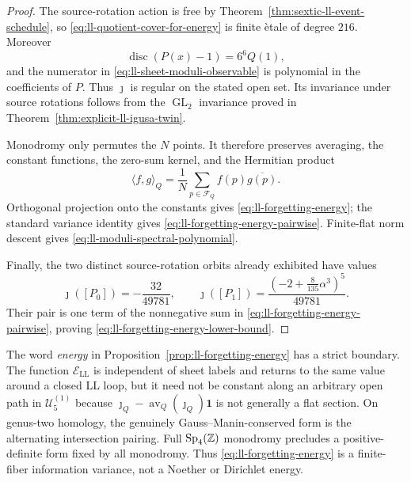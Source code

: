 \begin{proof}
The source-rotation action is free by
Theorem~\ref{thm:sextic-ll-event-schedule}, so
\eqref{eq:ll-quotient-cover-for-energy} is finite \`etale of degree $216$.
Moreover
\begin{equation}
 \operatorname{disc}(P(x)-1)=6^6Q(1),
 \label{eq:ll-energy-common-denominator}
\end{equation}
and the numerator in \eqref{eq:ll-sheet-moduli-observable} is polynomial in
the coefficients of $P$.  Thus $\jmath$ is regular on the stated open set.
Its invariance under source rotations follows from the
$\operatorname{GL}_2$ invariance proved in
Theorem~\ref{thm:explicit-ll-igusa-twin}.

Monodromy only permutes the $N$ points.  It therefore preserves averaging,
the constant functions, the zero-sum kernel, and the Hermitian product
\begin{equation}
 \langle f,g\rangle_Q
 =\frac1N\sum_{p\in\mathcal F_Q}f(p)\overline{g(p)}.
 \label{eq:ll-permutation-hermitian-product}
\end{equation}
Orthogonal projection onto the constants gives
\eqref{eq:ll-forgetting-energy}; the standard variance identity gives
\eqref{eq:ll-forgetting-energy-pairwise}.  Finite-flat norm descent gives
\eqref{eq:ll-moduli-spectral-polynomial}.

Finally, the two distinct source-rotation orbits already exhibited have values
\begin{equation}
 \jmath([P_0])=-\frac{32}{49781},
 \qquad
 \jmath([P_1])
 =\frac{\left(-2+\frac8{135}\alpha^3\right)^5}{49781}.
 \label{eq:ll-twin-sheet-observable-values}
\end{equation}
Their pair is one term of the nonnegative sum in
\eqref{eq:ll-forgetting-energy-pairwise}, proving
\eqref{eq:ll-forgetting-energy-lower-bound}.
\end{proof}

The word \emph{energy} in Proposition~\ref{prop:ll-forgetting-energy} has a
strict boundary.  The function $\mathcal E_{\mathrm{LL}}$ is independent of
sheet labels and returns to the same value around a closed LL loop, but it need
not be constant along an arbitrary open path in $\mathcal U_5^{(1)}$ because
$\jmath_Q-\operatorname{av}_Q(\jmath_Q)\mathbf1$ is not generally a flat
section.  On genus-two homology, the genuinely Gauss--Manin-conserved form is
the alternating intersection pairing.  Full
$\operatorname{Sp}_4(\mathbb{Z})$ monodromy precludes a positive-definite form fixed by
all monodromy.  Thus \eqref{eq:ll-forgetting-energy} is a finite-fiber
information variance, not a Noether or Dirichlet energy.


